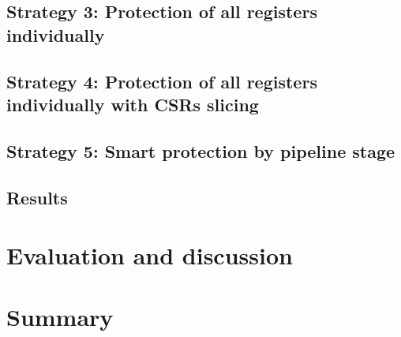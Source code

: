 \subsection{Strategy 3: Protection of all registers individually}

\subsection{Strategy 4: Protection of all registers individually with CSRs slicing}

\subsection{Strategy 5: Smart protection by pipeline stage}

\subsection{Results}


\section{Evaluation and discussion}
\label{section:chap6_discussion}


\section{Summary}


